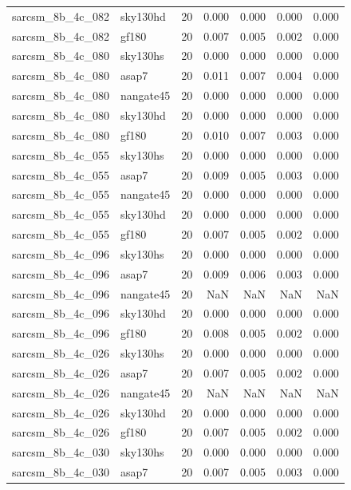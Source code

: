\begin{tabular}{llrrrrr}
sarcsm\_8b\_4c\_082 & sky130hd & 20 & 0.000 & 0.000 & 0.000 & 0.000 \\
sarcsm\_8b\_4c\_082 & gf180 & 20 & 0.007 & 0.005 & 0.002 & 0.000 \\
sarcsm\_8b\_4c\_080 & sky130hs & 20 & 0.000 & 0.000 & 0.000 & 0.000 \\
sarcsm\_8b\_4c\_080 & asap7 & 20 & 0.011 & 0.007 & 0.004 & 0.000 \\
sarcsm\_8b\_4c\_080 & nangate45 & 20 & 0.000 & 0.000 & 0.000 & 0.000 \\
sarcsm\_8b\_4c\_080 & sky130hd & 20 & 0.000 & 0.000 & 0.000 & 0.000 \\
sarcsm\_8b\_4c\_080 & gf180 & 20 & 0.010 & 0.007 & 0.003 & 0.000 \\
sarcsm\_8b\_4c\_055 & sky130hs & 20 & 0.000 & 0.000 & 0.000 & 0.000 \\
sarcsm\_8b\_4c\_055 & asap7 & 20 & 0.009 & 0.005 & 0.003 & 0.000 \\
sarcsm\_8b\_4c\_055 & nangate45 & 20 & 0.000 & 0.000 & 0.000 & 0.000 \\
sarcsm\_8b\_4c\_055 & sky130hd & 20 & 0.000 & 0.000 & 0.000 & 0.000 \\
sarcsm\_8b\_4c\_055 & gf180 & 20 & 0.007 & 0.005 & 0.002 & 0.000 \\
sarcsm\_8b\_4c\_096 & sky130hs & 20 & 0.000 & 0.000 & 0.000 & 0.000 \\
sarcsm\_8b\_4c\_096 & asap7 & 20 & 0.009 & 0.006 & 0.003 & 0.000 \\
sarcsm\_8b\_4c\_096 & nangate45 & 20 & NaN & NaN & NaN & NaN \\
sarcsm\_8b\_4c\_096 & sky130hd & 20 & 0.000 & 0.000 & 0.000 & 0.000 \\
sarcsm\_8b\_4c\_096 & gf180 & 20 & 0.008 & 0.005 & 0.002 & 0.000 \\
sarcsm\_8b\_4c\_026 & sky130hs & 20 & 0.000 & 0.000 & 0.000 & 0.000 \\
sarcsm\_8b\_4c\_026 & asap7 & 20 & 0.007 & 0.005 & 0.002 & 0.000 \\
sarcsm\_8b\_4c\_026 & nangate45 & 20 & NaN & NaN & NaN & NaN \\
sarcsm\_8b\_4c\_026 & sky130hd & 20 & 0.000 & 0.000 & 0.000 & 0.000 \\
sarcsm\_8b\_4c\_026 & gf180 & 20 & 0.007 & 0.005 & 0.002 & 0.000 \\
sarcsm\_8b\_4c\_030 & sky130hs & 20 & 0.000 & 0.000 & 0.000 & 0.000 \\
sarcsm\_8b\_4c\_030 & asap7 & 20 & 0.007 & 0.005 & 0.003 & 0.000 \\

\end{tabular}
